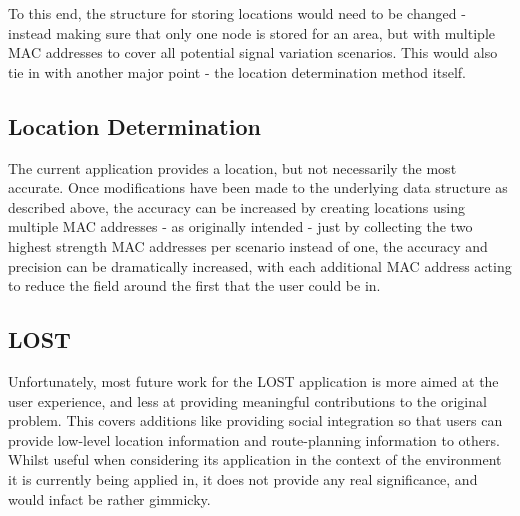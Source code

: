 \documentclass[11pt]{informatics-report}
\begin{document}
To this end, the structure for storing locations would need to be changed - instead making sure that only one node is stored for an area, but with multiple MAC addresses to cover all potential signal variation scenarios. This would also tie in with another major point - the location determination method itself.

\subsection{Location Determination}

The current application provides a location, but not necessarily the most accurate. Once modifications have been made to the underlying data structure as described above, the accuracy can be increased by creating locations using multiple MAC addresses - as originally intended - just by collecting the two highest strength MAC addresses per scenario instead of one, the accuracy and precision can be dramatically increased, with each additional MAC address acting to reduce the field around the first that the user could be in.

\subsection{LOST}

Unfortunately, most future work for the LOST application is more aimed at the user experience, and less at providing meaningful contributions to the original problem. This covers additions like providing social integration so that users can provide low-level location information and route-planning information to others. Whilst useful when considering its application in the context of the environment it is currently being applied in, it does not provide any real significance, and would infact be rather gimmicky.



%
%
%
%
%
%




\appendix

%
%
\end{document}
